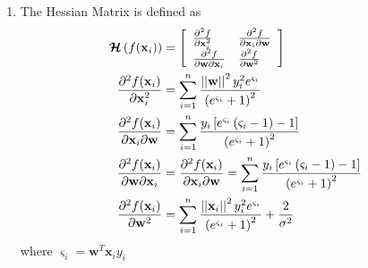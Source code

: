 \documentclass[12pt, fullpage,letterpaper]{article}
\begin{document}
\begin{enumerate}
\item The Hessian Matrix is defined as
\begin{align}
\boldsymbol{\mathcal{H}}\left(f(\mathbf{x}_{i})\right) &= \left[ \begin{array}{l l}
\frac{\partial^{2}f}{\partial \mathbf{x}_{i}^{2}} & \frac{\partial^{2}f}{\partial \mathbf{x}_{i}\partial \mathbf{w}}\\
\frac{\partial^{2}f}{\partial \mathbf{w} \partial \mathbf{x}_{i}} & \frac{\partial^{2}f}{\partial \mathbf{w}^{2}}
\end{array} \right]\\
\frac{\partial^{2}f(\mathbf{x}_{i})}{\partial \mathbf{x}_{i}^{2}} &= \sum_{i=1}^{n} \frac{\left|\left|\mathbf{w}\right|\right|^{2}y_{i}^{2}e^{\varsigma_{i}}}{\left(e^{\varsigma_{i}}+1\right)^{2}}\\
\frac{\partial^{2}f(\mathbf{x}_{i})}{\partial \mathbf{x}_{i}\partial \mathbf{w}} &= \sum_{i=1}^{n}\frac{y_{i}\left[e^{\varsigma_{i}}\left(\varsigma_{i}-1\right)-1\right]}{\left(e^{\varsigma_{i}}+1\right)^{2}}\\
\frac{\partial^{2}f(\mathbf{x}_{i})}{\partial \mathbf{w} \partial \mathbf{x}_{i}} &= \frac{\partial^{2}f(\mathbf{x}_{i})}{\partial \mathbf{x}_{i}\partial \mathbf{w}} = \sum_{i=1}^{n}\frac{y_{i}\left[e^{\varsigma_{i}}\left(\varsigma_{i}-1\right)-1\right]}{\left(e^{\varsigma_{i}}+1\right)^{2}}\\
\frac{\partial^{2}f(\mathbf{x}_{i})}{\partial \mathbf{w}^{2}} &= \sum_{i=1}^{n}\frac{\left|\left|\mathbf{x}_{i}\right|\right|^{2}y_{i}^{2}e^{\varsigma_{i}}}{\left(e^{\varsigma_{i}}+1\right)^{2}}+\frac{2}{\sigma^{2}}
\end{align}
where $\varsigma_{i} = \mathbf{w}^{T}\mathbf{x}_{i}y_{i}$


\end{enumerate}
\end{document}
